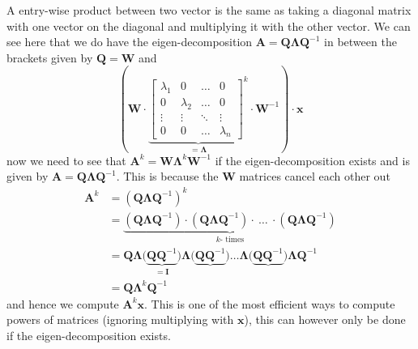 \documentclass{article}
\begin{document}
A entry-wise product between two vector is the same as taking a diagonal matrix with one vector on the diagonal and multiplying it with the other vector. We can see here that we do have the eigen-decomposition $\mathbf{A} = \mathbf{Q}\mathbf{\Lambda}\mathbf{Q}^{-1}$ in between the brackets given by $\mathbf{Q} = \mathbf{W}$ and 
\begin{equation*}
    \left(\mathbf{W} \cdot\underbrace{\begin{bmatrix}
       \lambda_{1} & 0 & \dots & 0 \\
       0 & \lambda_{2} & \dots & 0 \\
       \vdots & \vdots & \ddots & \vdots \\
       0 & 0 & \dots & \lambda_{n}
   \end{bmatrix}^{k}}_{= \mathbf{\Lambda}}\cdot \mathbf{W}^{-1}\right) \cdot \mathbf{x}
\end{equation*}
now we need to see that $\mathbf{A}^{k} = \mathbf{W}\mathbf{\Lambda}^{k}\mathbf{W}^{-1}$ if the eigen-decomposition exists and is given by $\mathbf{A} = \mathbf{Q}\mathbf{\Lambda}\mathbf{Q}^{-1}$. This is because the $\mathbf{W}$ matrices cancel each other out
\begin{align*}
    \mathbf{A}^{k} &= \left(\mathbf{Q}\mathbf{\Lambda}\mathbf{Q}^{-1}\right)^{k} \\
    &= \underbrace{\left(\mathbf{Q}\mathbf{\Lambda}\mathbf{Q}^{-1}\right) \cdot \left(\mathbf{Q}\mathbf{\Lambda}\mathbf{Q}^{-1}\right) \cdot \: \dots \: \cdot \left(\mathbf{Q}\mathbf{\Lambda}\mathbf{Q}^{-1}\right)}_{k\text{- times}} \\
    &= \mathbf{Q}\mathbf{\Lambda}\big(\underbrace{\mathbf{Q}\mathbf{Q}^{-1}}_{= \mathbf{I}}\big)\mathbf{\Lambda}\big(\underbrace{\mathbf{Q}\mathbf{Q}^{-1}}\big) \dots \mathbf{\Lambda}\big(\underbrace{\mathbf{Q}\mathbf{Q}^{-1}}\big)\mathbf{\Lambda}\mathbf{Q}^{-1} \\
    &= \mathbf{Q}\mathbf{\Lambda}^{k}\mathbf{Q}^{-1}
\end{align*}
and hence we compute $\mathbf{A}^{k}\mathbf{x}$. This is one of the most efficient ways to compute powers of matrices (ignoring multiplying with $\mathbf{x}$), this can however only be done if the eigen-decomposition exists.
\end{document}
